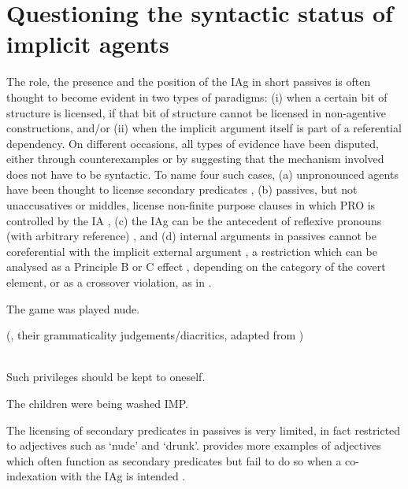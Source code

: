 \documentclass[output=paper]{langsci/langscibook}
\begin{document}
\section{Questioning the syntactic status of implicit
agents}\label{sec:key:22.2}

The role, the presence and the position of the \gls{IAg}
in short passives is often thought to become evident in two types of paradigms:
(i) when a certain bit of structure is licensed, if that bit of structure
cannot be licensed in non-agentive constructions, and/or (ii) when the implicit
argument itself is part of a referential dependency. On different occasions,
all types of evidence have been disputed, either through counterexamples or by
suggesting that the mechanism involved does not have to be syntactic. To name
four such cases, (a) unpronounced agents have been thought to license secondary
predicates , (b) passives, but not
unaccusatives or middles,
license non-finite purpose clauses in which PRO is controlled by the IA
, (c) the \gls{IAg} can be the
antecedent of reflexive pronouns (with arbitrary reference) ,
and (d) internal arguments in passives cannot be coreferential with the
implicit external argument , a restriction which can be
analysed as a Principle B or C effect \parencite{Kratzer1994,Kratzer2000},
depending on the category of the covert element, or as a crossover violation,
as in \citet{BakJohRob1989}.

\ea\label{ex:key:22.1}
    The game was played nude.
\z

\ea\label{ex:key:22.2} \citeauthor{BhattPancheva2006}
(\citeyear{BhattPancheva2006}, their grammaticality
judgements/diacritics, adapted from \citealt{Manzini1983})\\
    \z
\z

\ea\label{ex:key:22.3}\textcite[228]{BakJohRob1989}\\
    Such privileges should be kept to oneself.
\z

\ea\label{ex:key:22.4}
    The children were being washed IMP.
\z

The licensing of secondary predicates in  passives is very limited, in
fact restricted to adjectives such as ‘nude’ and ‘drunk’. \citet{Landau2010}
provides more examples of adjectives which often function as secondary
predicates but fail to do so when a co-indexation with the \gls{IAg} is intended
.
\end{document}
